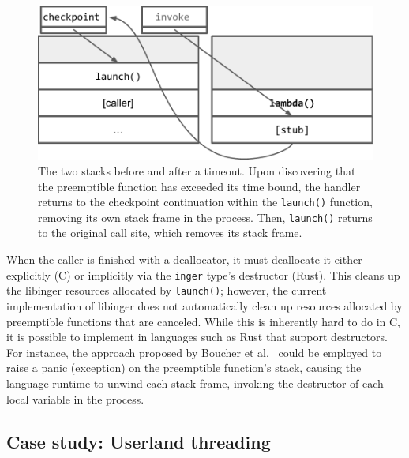 \begin{figure}
\includegraphics[width=\columnwidth]{figs/twostacks}
\caption{The two stacks before and after a timeout.  \textnormal{Upon discovering
that the preemptible function has exceeded its time bound, the handler returns to the
checkpoint continuation within the \texttt{launch()} function, removing its own stack
frame in the process.  Then, \texttt{launch()} returns to the original call site,
which removes its stack frame.}}
\label{fig:twostacks}
\end{figure}

When the caller is finished with a deallocator, it must deallocate it either
explicitly (C) or implicitly via the \texttt{inger} type's destructor (Rust).  This
cleans up the libinger resources allocated by \texttt{launch()}; however, the
current implementation of libinger does not automatically clean up resources
allocated by preemptible functions that are canceled.  While this is inherently hard
to do in C, it is possible to implement in languages such as Rust that support
destructors.  For instance, the approach proposed by Boucher et
al.~\cite{boucher:atc2018} could be employed to raise a panic (exception) on the
preemptible function's stack, causing the language runtime to unwind each stack frame,
invoking the destructor of each local variable in the process.

\subsection{Case study: Userland threading}
\label{sec:threading}
